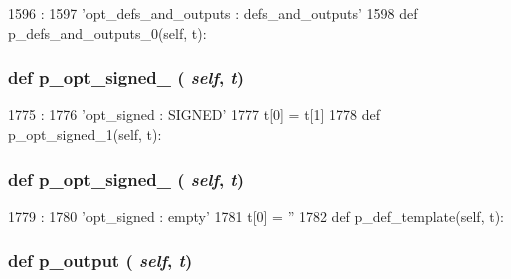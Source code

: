 \begin{DoxyCode}
1596                                          :
1597         'opt_defs_and_outputs : defs_and_outputs'
1598 
    def p_defs_and_outputs_0(self, t):
\end{DoxyCode}
\hypertarget{classisa__parser_1_1ISAParser_abb51e6d2be69f1f88b287eef8b74c24a}{
\subsubsection[{p\_\-opt\_\-signed\_\-0}]{\setlength{\rightskip}{0pt plus 5cm}def p\_\-opt\_\-signed\_ ( {\em self}, \/   {\em t})}}
\label{classisa__parser_1_1ISAParser_abb51e6d2be69f1f88b287eef8b74c24a}



\begin{DoxyCode}
1775                                :
1776         'opt_signed : SIGNED'
1777         t[0] = t[1]
1778 
    def p_opt_signed_1(self, t):
\end{DoxyCode}
\hypertarget{classisa__parser_1_1ISAParser_a1139be203adb387357147952776b6dde}{
\subsubsection[{p\_\-opt\_\-signed\_\-1}]{\setlength{\rightskip}{0pt plus 5cm}def p\_\-opt\_\-signed\_ ( {\em self}, \/   {\em t})}}
\label{classisa__parser_1_1ISAParser_a1139be203adb387357147952776b6dde}



\begin{DoxyCode}
1779                                :
1780         'opt_signed : empty'
1781         t[0] = ''
1782 
    def p_def_template(self, t):
\end{DoxyCode}
\hypertarget{classisa__parser_1_1ISAParser_a0911fee7692e9b45fd460b83a2d07727}{
\subsubsection[{p\_\-output}]{\setlength{\rightskip}{0pt plus 5cm}def p\_\-output ( {\em self}, \/   {\em t})}}
\label{classisa__parser_1_1ISAParser_a0911fee7692e9b45fd460b83a2d07727}



